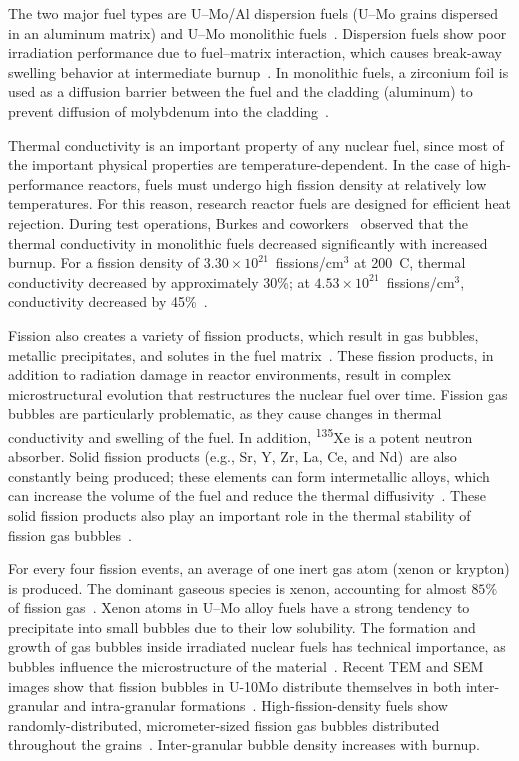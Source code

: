 The two major fuel types are U--Mo/Al dispersion fuels (U--Mo grains dispersed in an aluminum matrix) and U--Mo monolithic fuels~\cite{keiser2012effects}. Dispersion fuels show poor irradiation performance due to fuel--matrix interaction, which causes break-away swelling behavior at intermediate burnup~\cite{hofman2004post,van2008transmission, leenaers2004post}. In monolithic fuels, a zirconium foil is used as a diffusion barrier between the fuel and the cladding (aluminum) to prevent diffusion of molybdenum into the cladding~\cite{jue2014microstructural}.

Thermal conductivity is an important property of any nuclear fuel, since most of the important physical properties are temperature-dependent. In the case of high-performance reactors, fuels must undergo high fission density at relatively low temperatures. For this reason, research reactor fuels are designed for efficient heat rejection. During test operations, Burkes and coworkers~\cite{burkes2015thermal} observed that the thermal conductivity in monolithic fuels decreased significantly with increased burnup. For a fission density of $3.30\times10^{21}$~fissions/cm$^3$ at 200~\textdegree C, thermal conductivity decreased by approximately 30\%; at $4.53\times10^{21}$~fissions/cm$^{3}$, conductivity decreased by 45\%~\cite{burkes2015thermal}.

Fission also creates a variety of fission products, which result in gas
bubbles, metallic precipitates, and solutes in the fuel
matrix~\cite{rondinella2010high}. These fission products, in addition to
radiation damage in reactor environments, result in complex microstructural
evolution that restructures the nuclear fuel over time. Fission gas bubbles are
particularly problematic, as they cause changes in thermal conductivity and
swelling of the fuel. In addition, \textsuperscript{135}Xe is a potent neutron
absorber. {Solid fission products (e.g., Sr, Y, Zr, La, Ce,
and Nd)\ are also constantly being produced; these elements can form
intermetallic alloys, which can increase the volume of the fuel and reduce the
thermal diffusivity~\cite{ishimoto1994effects, kang2007thermal}. These solid
fission products also play an important role in the thermal stability of
fission gas bubbles~\cite{gan2015thermal}.} 

For every four fission events, an average of one inert gas atom (xenon or krypton) is produced. The dominant gaseous species is xenon, accounting for almost $85\%$ of fission gas~\cite{blades1956ratio,petruska1955absolute}. Xenon atoms in U--Mo alloy fuels have a strong tendency to precipitate into small bubbles due to their low solubility. The formation and growth of gas bubbles inside irradiated nuclear fuels has technical importance, as bubbles influence the microstructure of the material~\cite{kim2011fission}. Recent TEM and SEM images show that fission bubbles in U-10Mo distribute themselves in both inter-granular and intra-granular formations~\cite{miller2015transmission,miller2012advantages, gan2012tem, gan2010transmission}. High-fission-density fuels show randomly-distributed, micrometer-sized fission gas bubbles distributed throughout the grains~\cite{gan2012tem}. Inter-granular bubble density increases with burnup. 

